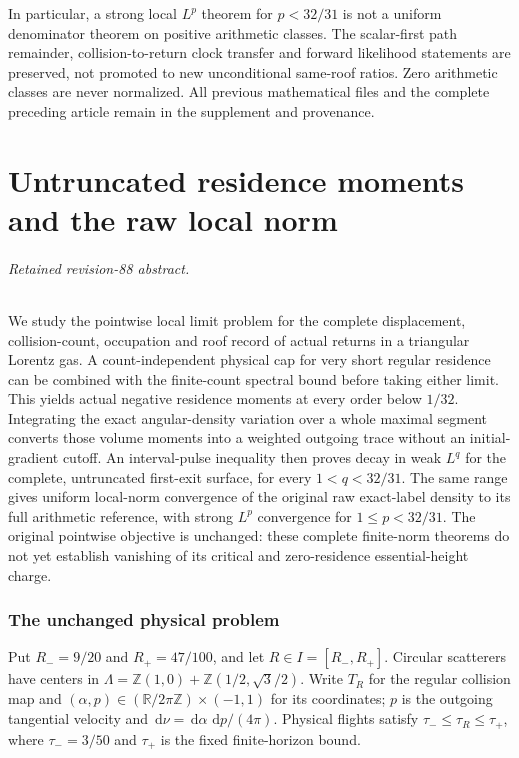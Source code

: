 \documentclass[11pt,reqno]{amsart}
\numberwithin{equation}{section}
\theoremstyle{definition}\newtheorem{definition}[theorem]{Definition}
\theoremstyle{remark}\newtheorem{remark}[theorem]{Remark}
\newcommand{\R}{\mathbb R}\newcommand{\Z}{\mathbb Z}\newcommand{\T}{\mathbb T}
\newcommand{\dd}{\,\mathrm d}\newcommand{\one}{\mathbf1}
\theoremstyle{definition}\newtheorem{inputstatement}[theorem]{Input statement}
\begin{document}
In particular, a strong local $L^p$ theorem for $p<32/31$ is not a
uniform denominator theorem on positive arithmetic classes. The
scalar-first path remainder, collision-to-return clock transfer and
forward likelihood statements are preserved, not promoted to new
unconditional same-roof ratios. Zero arithmetic classes are never
normalized. All previous mathematical files and the complete preceding
article remain in the supplement and provenance.


\endgroup
\part{Untruncated residence moments and the raw local norm}
\begingroup
\let\ArchiveLabel\label
\let\ArchiveRef\ref
\renewcommand{\label}[1]{\ArchiveLabel{v88archive:#1}}
\renewcommand{\ref}[1]{%
  \IfBeginWith{#1}{supp-}{%
    \StrBehind{#1}{supp-}[\ArchiveTarget]%
    \ArchiveRef{\ArchiveTarget}%
  }{\ArchiveRef{v88archive:#1}}%
}
\makeatletter
\let\ltx@label\label
\makeatother
\paragraph{Retained revision-88 abstract.}

We study the pointwise local limit problem for the complete displacement,
collision-count, occupation and roof record of actual returns in a
triangular Lorentz gas. A count-independent physical cap for very short
regular residence can be combined with the finite-count spectral bound
before taking either limit. This yields actual negative residence moments
at every order below $1/32$. Integrating the exact angular-density
variation over a whole maximal segment converts those volume moments
into a weighted outgoing trace without an initial-gradient cutoff.
An interval-pulse inequality then proves decay in weak $L^q$ for the
complete, untruncated first-exit surface, for every $1<q<32/31$.
The same range gives uniform local-norm convergence of the original
raw exact-label density to its full arithmetic reference, with strong
$L^p$ convergence for $1\le p<32/31$. The original pointwise objective
is unchanged: these complete finite-norm theorems do not yet establish
vanishing of its critical and zero-residence essential-height charge.



\section{The unchanged physical problem}
Put $R_-=9/20$ and $R_+=47/100$, and let $R\in I=[R_-,R_+]$. Circular scatterers have centers in
$\Lambda=\Z(1,0)+\Z(1/2,\sqrt3/2)$. Write $T_R$ for the regular
collision map and $(\alpha,p)\in(\R/2\pi\Z)\times(-1,1)$ for its
coordinates; $p$ is the outgoing tangential velocity and
$\dd\nu=\dd\alpha\,\dd p/(4\pi)$. Physical flights satisfy
$\tau_-\le\tau_R\le\tau_+$, where $\tau_-=3/50$ and $\tau_+$
is the fixed finite-horizon bound.
\end{document}
